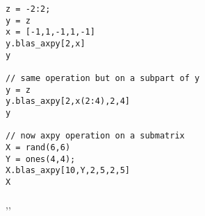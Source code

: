 \begin{examples}
\begin{Verbatim}
z = -2:2;
y = z
x = [-1,1,-1,1,-1]
y.blas_axpy[2,x]
y 

// same operation but on a subpart of y
y = z
y.blas_axpy[2,x(2:4),2,4]
y

// now axpy operation on a submatrix
X = rand(6,6)
Y = ones(4,4);
X.blas_axpy[10,Y,2,5,2,5]
X
\end{Verbatim}

\end{examples}

\begin{manseealso}
 ,,
\end{manseealso}

